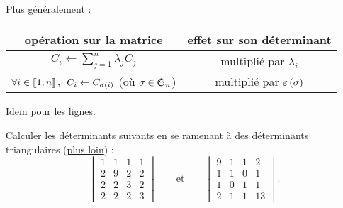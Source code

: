 Plus généralement :

\begin{center}
\begin{tabular}{|c|c|}
\hline
opération sur la matrice & effet sur son déterminant \\
\hline
\(C_i\gets\sum_{j=1}^n\lambda_jC_j\) & multiplié par \(\lambda_i\) \\
\hline
\(\quantifs{\forall i\in\interventierii{1}{n}}C_i\gets C_{\sigma\paren{i}}\) (où \(\sigma\in\S{n}\)) & multiplié par \(\epsilon\paren{\sigma}\) \\
\hline
\end{tabular}
\end{center}

Idem pour les lignes.

\begin{exoex}
Calculer les déterminants suivants en se ramenant à des déterminants triangulaires (\cf \hyperref[subsubsec:déterminantsTriangulaires]{plus loin}) : \[\begin{vmatrix}
1 & 1 & 1 & 1 \\
2 & 9 & 2 & 2 \\
2 & 2 & 3 & 2 \\
2 & 2 & 2 & 3
\end{vmatrix}\qquad\text{et}\qquad\begin{vmatrix}
9 & 1 & 1 & 2 \\
1 & 1 & 0 & 1 \\
1 & 0 & 1 & 1 \\
2 & 1 & 1 & 13
\end{vmatrix}.\]
\end{exoex}

